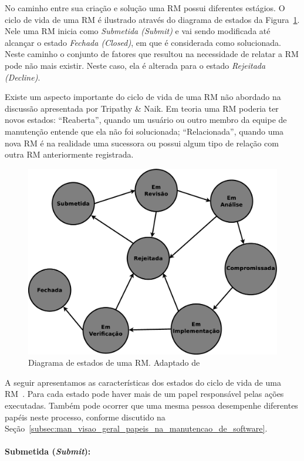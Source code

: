 No caminho entre sua criação e solução uma RM possui diferentes estágios. O
ciclo de vida de uma RM é ilustrado através do diagrama de estados da
Figura~\ref{fig:diagrama-estado-rm}. Nele uma RM inicia como \textit{Submetida
    (Submit)} e vai sendo modificada até alcançar o estado \textit{Fechada
    (Closed)}, em que é considerada como solucionada. Neste caminho o conjunto
de fatores que resultou na necessidade de relatar a RM pode não mais existir.
Neste caso, ela é alterada para o estado \textit{Rejeitada (Decline)}.

Existe um aspecto importante do ciclo de vida de uma RM não abordado na
discussão apresentada por Tripathy \& Naik. Em teoria uma RM poderia ter novos
estados: ``Reaberta'', quando um usuário ou outro membro da equipe de manutenção
entende que ela não foi solucionada; ``Relacionada'', quando uma nova RM é na
realidade uma sucessora ou possui algum tipo de relação com outra RM
anteriormente registrada.

\begin{figure}[htpb]
	\centering
    \includegraphics[width=0.7\linewidth]{./chapter-manutencao-software-visao-geral/img/diagrama-estado-rm.eps}
	\caption{Diagrama de estados de uma RM\@. Adaptado
		de~\cite{tripathy2014software}}\label{fig:diagrama-estado-rm}
\end{figure}

A seguir apresentamos as características dos estados do ciclo de vida de uma
RM~\cite{tripathy2014software}. Para cada estado pode haver mais de um papel
responsável pelas ações executadas. Também pode ocorrer que uma mesma pessoa
desempenhe diferentes papéis neste processo, conforme discutido na
Seção~\ref{subsec:man_visao_geral_papeis_na_manutencao_de_software}.

\paragraph{Submetida (\textit{Submit}):}\label{par:submetida)}

